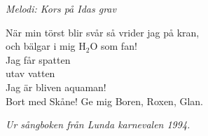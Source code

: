 {\footnotesize\textit{Melodi: Kors på Idas grav}}\par
\vspace{10pt}
När min törst blir svår så vrider jag på kran,\\
och bälgar i mig H$_2$O som fan!\\
Jag får spatten\\
utav vatten\\
Jag är bliven aquaman!\\
Bort med Skåne! Ge mig Boren, Roxen, Glan.\par
\vspace{10pt}
{\footnotesize\textit{Ur sångboken från Lunda karnevalen 1994.}}
